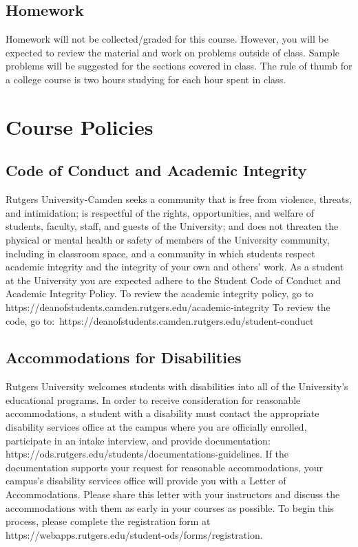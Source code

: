 \documentclass[11pt]{article}
\begin{document}
\subsection*{Homework}
Homework will not be collected/graded for this course. However, you will be expected
to review the material and work on problems outside of class. Sample problems will be suggested
for the sections covered in class. The rule of thumb for a college course is two hours studying for
each hour spent in class.


\section*{Course Policies}

\subsection*{Code of Conduct and Academic Integrity}
\footnotesize{Rutgers University-Camden seeks a community that is free from violence, threats, and intimidation; is
respectful of the rights, opportunities, and welfare of students, faculty, staff, and guests of the
University; and does not threaten the physical or mental health or safety of members of the University
community, including in classroom space, and a community in which students respect academic
integrity and the integrity of your own and others’ work.
As a student at the University you are expected adhere to the Student Code of Conduct and
Academic Integrity Policy. To review the academic integrity policy, go to
https://deanofstudents.camden.rutgers.edu/academic-integrity To review the code, go
to: https://deanofstudents.camden.rutgers.edu/student-conduct}

\subsection*{Accommodations for Disabilities}
\footnotesize{Rutgers University welcomes students with disabilities into all of the University’s educational programs. In order to receive consideration for reasonable accommodations, a student with a disability must contact the appropriate disability services office at the campus where you are officially enrolled, participate in an intake interview, and provide documentation: https://ods.rutgers.edu/students/documentations-guidelines. If the documentation supports your request for reasonable accommodations, your campus’s disability services office will provide you with a Letter of Accommodations. Please share this letter with your instructors and discuss the accommodations with them as early in your courses as possible. To begin this process, please complete the registration form at \\https://webapps.rutgers.edu/student-ods/forms/registration.}
\end{document}

